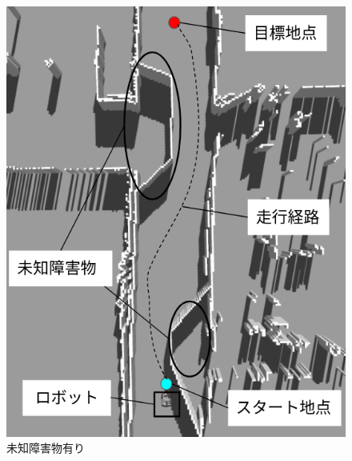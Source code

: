 \begin{figure}[htbp]
  \begin{minipage}[b]{0.5\linewidth}
    \centering
    \includegraphics[keepaspectratio, scale=0.32]{figs/gazebo_unknown_obstacles.png}
    \caption{未知障害物有り}
    \label{fig:gazebo_unknown}
  \end{minipage}
  \begin{minipage}[b]{0.5\linewidth}
    \centering

\end{minipage}
\end{figure}
